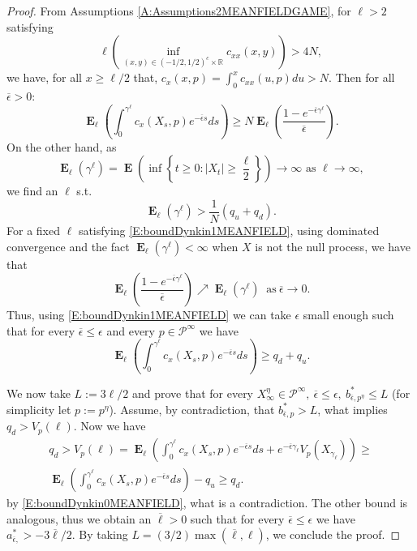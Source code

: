 \documentclass{article}
\newcommand\E{\operatorname{\mathbf{E}}}
\begin{document}
\begin{proof}
From Assumptions \ref{A:Assumptions2MEANFIELDGAME}, for $\ell>2$ satisfying 
$$ \ell\left( \inf_{(x,y)\in (-1/2,1/2)^c \times \mathbb{R}  }c_{xx}(x,y) \right) >4N,  $$
we have, for all $x\geq \ell/2$ that,
$
c_x(x,p)= \int_0^x c_{xx}(u,p) du >  N.
$
Then for all $\overline{\epsilon} >0$:
\begin{equation}\label{E:boundDynkin0}
\E_{\ell} \left(\int_0^{\gamma^\ell}c_x(X_s,p)e^{-\overline{\epsilon}  s}ds \right)
\geq N\E_{\ell} \left( \frac{1-e^{-\overline{\epsilon}  \gamma^{\ell}}}{\overline{\epsilon} } \right).
\end{equation}
On the other hand, as
$$
\E_{\ell}(\gamma^\ell)=\E\left(\inf\left\lbrace t\geq 0\colon |X_t|\geq \frac{\ell}{2} \right\rbrace \right)\to\infty\text{ as $\ell\to\infty$},
$$
we find an $\ell$ s.t.
\begin{equation}\label{E:boundDynkin1MEANFIELD}
\E_{\ell} (\gamma^{\ell})  >\frac{1}{N}(q_u+q_d).
\end{equation}
%
%
For a fixed $\ell$ satisfying \eqref{E:boundDynkin1MEANFIELD}, using dominated convergence and the fact $\E_{\ell}(\gamma^{\ell})< \infty$ when $X$ is not the null process, we have that 
%
$$ \E_{\ell} \left( \frac{1-e^{-\overline{\epsilon}  \gamma^{\ell}}}{\overline{\epsilon} } \right) \nearrow  \E_{ \ell}(\gamma^{\ell}) \ \text{ as} \ \overline{\epsilon}  \to 0 .$$
Thus, using \eqref{E:boundDynkin1MEANFIELD} we can take $\epsilon$ small enough such that for every $\overline{\epsilon}  \leq \epsilon$ and every $p \in \mathcal{P}^{\infty}$ we have
\begin{equation}\label{E:boundDynkin0MEANFIELD}
\E_{\ell} \left(\int_0^{\gamma^\ell}c_x(X_s,p)e^{-\overline{\epsilon}  s}ds \right)
\geq q_d+q_u.
\end{equation}


We now take $L:= 3\ell/2$ and prove that for every $X_{\infty}^{\eta} \in \mathcal{P}^{\infty}, \ \overline{\epsilon}  \leq \epsilon, \ b^{\ast}_{\overline{\epsilon},p^{\eta} }\leq L$ (for simplicity let $p:=p^\eta$).
Assume, by contradiction, that $b^{\ast}_{\overline{\epsilon},p }>L$, what implies $q_d>V_p(\ell)$. 
Now we have 
\begin{multline*}
q_d > V_p(\ell)
=\E_{\ell} \left(  \int_0^{\gamma^\ell}c_x(X_s,p)e^{-\overline{\epsilon}  s}ds   
+e^{-\overline{\epsilon}  \gamma_\ell}V_p(X_{\gamma_\ell})\right)
\geq \\  \E_{\ell} \left(   \int_0^{\gamma^\ell}  c_x(X_s,p)e^{-\overline{\epsilon}  s}ds \right) -q_u \geq q_d.
\end{multline*}
by \eqref{E:boundDynkin0MEANFIELD}, what is a contradiction. 
The other bound is analogous, thus we obtain an $\overline{\ell}>0$ such that for every $\overline{\epsilon} \leq \epsilon$ we have $a^{\ast}_{\overline{\epsilon},}>-3 \overline{\ell}/2$. By taking $L= (3/2)\max(\overline{\ell},\ell) $, we conclude the proof.
%
\end{proof}
\end{document}
